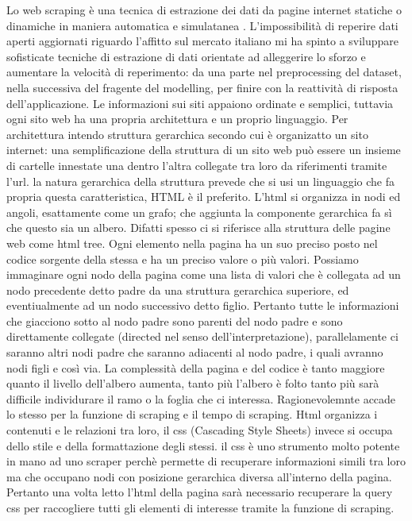 \documentclass[
  12pt,
  a4paper,
]{book}
\begin{document}
Lo web scraping è una tecnica di estrazione dei dati da pagine internet statiche o dinamiche in maniera automatica e simulatanea \citep{wiki:xxx}. L'impossibilità di reperire dati aperti aggiornati riguardo l'affitto sul mercato italiano mi ha spinto a sviluppare sofisticate tecniche di estrazione di dati orientate ad alleggerire lo sforzo e aumentare la velocità di reperimento: da una parte nel preprocessing del dataset, nella successiva del fragente del modelling, per finire con la reattività di risposta dell'applicazione.
Le informazioni sui siti appaiono ordinate e semplici, tuttavia ogni sito web ha una propria architettura e un proprio linguaggio. Per architettura intendo struttura gerarchica secondo cui è organizatto un sito internet: una semplificazione della struttura di un sito web può essere un insieme di cartelle innestate una dentro l'altra collegate tra loro da riferimenti tramite l'url. la natura gerarchica della struttura prevede che si usi un linguaggio che fa propria questa caratteristica, HTML è il preferito. L'html si organizza in nodi ed angoli, esattamente come un grafo; che aggiunta la componente gerarchica fa sì che questo sia un albero. Difatti spesso ci si riferisce alla struttura delle pagine web come html tree. Ogni elemento nella pagina ha un suo preciso posto nel codice sorgente della stessa e ha un preciso valore o più valori. Possiamo immaginare ogni nodo della pagina come una lista di valori che è collegata ad un nodo precedente detto padre da una struttura gerarchica superiore, ed eventiualmente ad un nodo successivo detto figlio. Pertanto tutte le informazioni che giacciono sotto al nodo padre sono parenti del nodo padre e sono direttamente collegate (directed nel senso dell'interpretazione), parallelamente ci saranno altri nodi padre che saranno adiacenti al nodo padre, i quali avranno nodi figli e così via.
La complessità della pagina e del codice è tanto maggiore quanto il livello dell'albero aumenta, tanto più l'albero è folto tanto più sarà difficile individurare il ramo o la foglia che ci interessa. Ragionevolemnte accade lo stesso per la funzione di scraping e il tempo di scraping.
Html organizza i contenuti e le relazioni tra loro, il css (Cascading Style Sheets) invece si occupa dello stile e della formattazione degli stessi. il css è uno strumento molto potente in mano ad uno scraper perchè permette di recuperare informazioni simili tra loro ma che occupano nodi con posizione gerarchica diversa all'interno della pagina. Pertanto una volta letto l'html della pagina sarà necessario recuperare la query css per raccogliere tutti gli elementi di interesse tramite la funzione di scraping.
\end{document}
